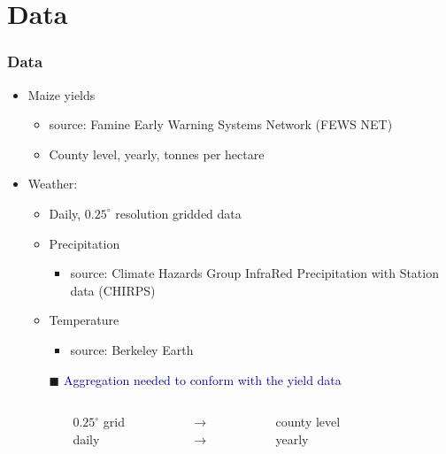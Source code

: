 \documentclass{beamer}              %
\begin{document}
\section{Data}
\begin{frame}\label{Data}
\frametitle{Data} 

\begin{itemize}
\item Maize yields
\begin{itemize}
\item source: Famine Early Warning Systems Network (FEWS NET)
\item County level, yearly, tonnes per hectare
\end{itemize}
\item Weather:
\begin{itemize}
\item Daily, $0.25^{\circ}$ resolution gridded data
\item Precipitation
	\begin{itemize}
	\item source: Climate Hazards Group InfraRed Precipitation with Station data (CHIRPS)
	\end{itemize}
\item Temperature
	\begin{itemize}
	\item source: Berkeley Earth
	\end{itemize}
	\item[$\blacksquare$] \textcolor{darkblue}{Aggregation needed to conform with the yield data}
	\end{itemize}

\end{itemize}

\begin{columns}
\footnotesize
	\begin{column}{0.4\textwidth}

	\end{column}
	\begin{column}{0.15\textwidth}
  		$0.25^{\circ}$ grid \\ daily
	\end{column}
	\begin{column}{0.05\textwidth}
  			$\rightarrow$ \\ $\rightarrow$
	\end{column}
	\begin{column}{0.25\textwidth} 
   		county level \\  yearly
   	\end{column}
   		\begin{column}{0.4\textwidth} 
   		\end{column}
\end{columns}


\end{frame}
\end{document}
